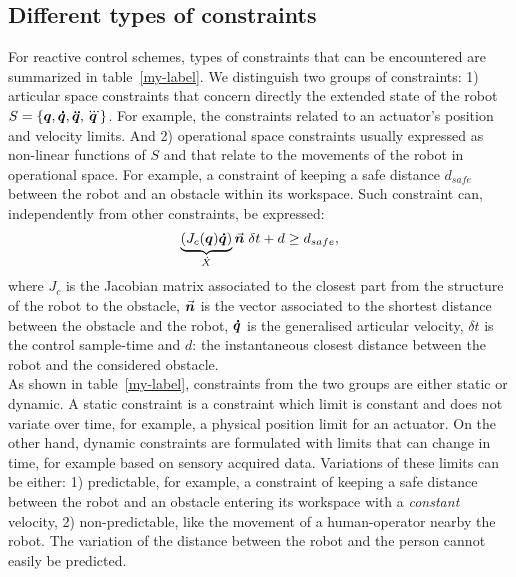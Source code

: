 \subsection{Different types of constraints}
For reactive control schemes, types of constraints that can be encountered are summarized in table~\ref{my-label}. We distinguish two groups of constraints: 1) articular space constraints that concern directly the extended state of the robot $S=\{\mbox{\boldmath${q}$}, \mbox{\boldmath${\dot{q}}$}, \mbox{\boldmath${\ddot{q}}$}, \mbox{\boldmath${\dddot{q}}$}\}$. For example, the constraints related to an actuator's position and velocity limits. And 2) operational space constraints usually expressed as non-linear functions of $S$ and that relate to the movements of the robot in operational space. For example, a constraint of keeping a safe distance $d_{safe}$ between the robot and an obstacle within its workspace. Such constraint can, independently from other constraints, be expressed: 
\begin{equation}
\underbrace{\left(J_{c}(\mbox{\boldmath${q}$}) \mbox{\boldmath${\dot{q}}$}\right) }_{\dot{X}} \vec{\mbox{\boldmath${n}$}} \hspace{1mm}\delta t + d \geq d_{safe},
\label{eq:bat_coll}
\end{equation}
where $J_c$ is the Jacobian matrix associated to the closest part from the structure of the robot to the obstacle, $\vec{\mbox{\boldmath${n}$}}$ is the vector associated to the shortest distance between the obstacle and the robot, $\mbox{\boldmath${\dot{q}}$}$ is the generalised articular velocity, $\delta t$ is the control sample-time and $d$: the instantaneous closest distance between the robot and the considered obstacle.
\\
As shown in table~\ref{my-label}, constraints from the two groups are either static or dynamic. A static constraint is a constraint which limit is constant and does not variate over time, for example, a physical position limit for an actuator. On the other hand, dynamic constraints are formulated with limits that can change in time, for example based on sensory acquired data. Variations of these limits can be either: 1) predictable, for example, a constraint of keeping a safe distance between the robot and an obstacle entering its workspace with a \textit{constant} velocity, 2) non-predictable, like the movement of a human-operator nearby the robot. The variation of the distance between the robot and the person cannot easily be predicted. \\
